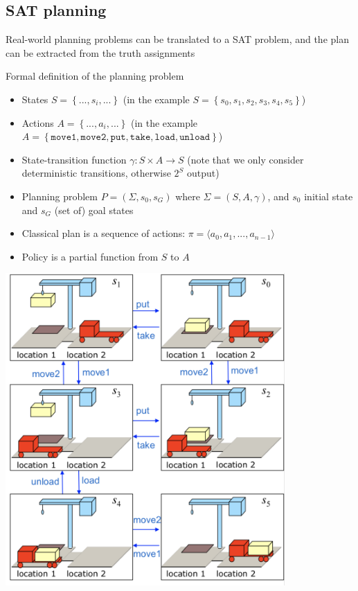 \subsection{SAT planning}
\begin{itemize}
	\item Real-world planning problems can be translated to a SAT problem, and the plan can be extracted from the truth assignments\\
	\begin{minipage}{.65\textwidth}
		\item Formal definition of the planning problem
	\begin{itemize}
		\item States $S=\left\{...,s_i,...\right\}$ (in the example $S=\left\{s_0, s_1, s_2, s_3, s_4, s_5\right\}$)
		\item Actions $A=\left\{..., a_i,...\right\}$ (in the example $A=\left\{\texttt{move1}, \texttt{move2}, \texttt{put}, \texttt{take}, \texttt{load}, \texttt{unload}\right\}$)
		\item State-transition function $\gamma:S\times A\to S$ (note that we only consider deterministic transitions, otherwise $2^S$ output)
		\item Planning problem $P=(\Sigma, s_0, s_G)$ where $\Sigma=(S,A,\gamma)$, and $s_0$ initial state and $s_G$ (set of) goal states
		\item Classical plan is a sequence of actions: $\pi = \langle a_0, a_1, ..., a_{n-1}\rangle$
		\item Policy is a partial function from $S$ to $A$
	\end{itemize}
	\end{minipage}
	\hspace{10mm}
	\begin{minipage}{.3\textwidth}
			\includegraphics[width=0.8\textwidth]{figures/kr_sat_planning_example.png}

\end{minipage}
\end{itemize}
